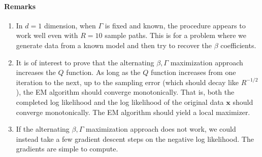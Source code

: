 \documentclass[12pt]{article}
\begin{document}
\paragraph{Remarks}
\begin{enumerate}
\item In $d=1$ dimension, when $\Gamma$ is fixed and known, the procedure appears to work well even with $R=10$ sample paths.  This is for a problem where we generate data from a known model and then try to recover the $\beta$ coefficients.
\item It is of interest to prove that the alternating $\beta, \Gamma$ maximization approach increases the $Q$ function.  As long as the $Q$ function increases from one iteration to the next, up to the sampling error (which should decay like $R^{-1/2}$), the EM algorithm should converge monotonically.  That is, both the completed log likelihood and the log likelihood of the original data $\mathbf{x}$ should converge monotonically.  The EM algorithm should yield a local maximizer.
\item If the alternating $\beta, \Gamma$ maximization approach does not work, we could instead take a few gradient descent steps on the negative log likelihood.  The gradients are simple to compute.
\end{enumerate}
\end{document}
